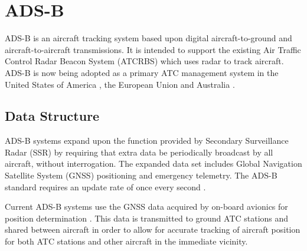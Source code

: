 \section{ADS-B}
ADS-B is an aircraft tracking system based upon digital aircraft-to-ground and aircraft-to-aircraft transmissions.  It is intended to support the existing Air Traffic Control Radar Beacon System (ATCRBS) which uses radar to track aircraft. ADS-B is now being adopted as a primary ATC management system in the United States of America \cite{ADSB_DOT}, the European Union and Australia \cite{ADSB_CASA_booklet}. 

\subsection{Data Structure}
ADS-B systems expand upon the function provided by Secondary Surveillance Radar (SSR) by requiring that extra data be periodically broadcast by all aircraft, without interrogation. The expanded data set includes Global Navigation Satellite System (GNSS) positioning and emergency telemetry. The ADS-B standard requires an update rate of once every second \cite{RTCA_MODE_S}.

Current ADS-B systems use the GNSS data acquired by on-board avionics for position determination \cite{ADSB_ICAO_man}. This data is transmitted to ground ATC stations and shared between aircraft in order to allow for accurate tracking of aircraft position for both ATC stations and other aircraft in the immediate vicinity. 

